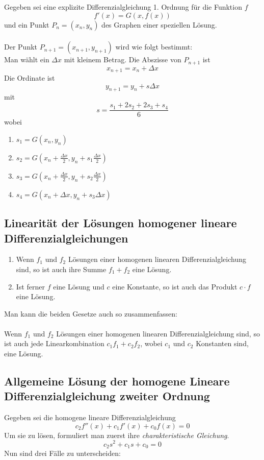 \documentclass[10pt,a4paper]{scrartcl}
\begin{document}
Gegeben sei eine explizite Differenzialgleichung 1. Ordnung für die Funktion $f$
$$f'(x) = G(x, f(x))$$
und ein Punkt $P_n = (x_n, y_n)$ des Graphen einer speziellen Lösung.\\\\
Der Punkt $P_{n+1} = (x_{n+1},y_{n+1})$ wird wie folgt bestimmt:\\
Man wählt ein $\Delta{x}$ mit kleinem Betrag. Die Abszisse von $P_{n+1}$ ist
$$x_{n+1} = x_n + \Delta x$$
Die Ordinate ist
$$y_{n+1} = y_n + s\Delta x$$
mit
$$s = \frac{s_1 + 2s_2 + 2s_3 + s_4}{6}$$
wobei
\begin{enumerate}
\item $\displaystyle s_1 = G(x_n, y_n)$
\item $\displaystyle s_2 = G\left(x_n + \frac{\Delta{x}}{2}, y_n + s_1 \frac{\Delta x}{2}\right)$
\item $\displaystyle s_3 = G\left(x_n + \frac{\Delta{x}}{2}, y_n + s_2 \frac{\Delta x}{2}\right)$
\item $\displaystyle s_4 = G(x_n+\Delta x, y_n+s_3\Delta x)$
\end{enumerate}


\subsection{Linearität der Lösungen homogener lineare Differenzialgleichungen}

\begin{enumerate}
\item Wenn $f_1$ und $f_2$ Lösungen einer homogenen linearen
Differenzialgleichung sind, so ist auch ihre Summe $f_1 + f_2$
eine Lösung.
\item Ist ferner $f$ eine Lösung und $c$ eine Konstante,
so ist auch das Produkt $c \cdot f$ eine Lösung.
\end{enumerate}
Man kann die beiden Gesetze auch so zusammenfassen:\\\\
Wenn $f_1$ und $f_2$ Lösungen einer homogenen linearen
Differenzialgleichung sind, so ist auch jede
Linearkombination $c_1f_1 + c_2f_2$, wobei $c_1$ und
$c_2$ Konstanten sind, eine Lösung.


\subsection{Allgemeine Lösung der homogene Lineare Differenzialgleichung zweiter Ordnung}

Gegeben sei die homogene lineare Differenzialgleichung
$$c_2f''(x) + c_1f'(x) + c_0f(x) = 0$$
Um sie zu lösen, formuliert man zuerst ihre \textit{charakteristische Gleichung}.
$$c_2s^2 + c_1s + c_0 = 0$$
Nun sind drei Fälle zu unterscheiden:
\end{document}
